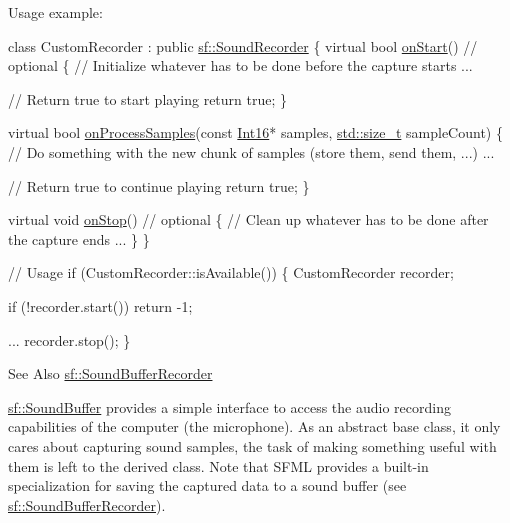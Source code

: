 Usage example\-: 
\begin{DoxyCode}
\textcolor{keyword}{class }CustomRecorder : \textcolor{keyword}{public} \hyperlink{classsf_1_1_sound_recorder}{sf::SoundRecorder}
\{
    \textcolor{keyword}{virtual} \textcolor{keywordtype}{bool} \hyperlink{classsf_1_1_sound_recorder_a7af418fb036201d3f85745bef78ce77f}{onStart}() \textcolor{comment}{// optional}
    \{
        \textcolor{comment}{// Initialize whatever has to be done before the capture starts}
        ...

        \textcolor{comment}{// Return true to start playing}
        \textcolor{keywordflow}{return} \textcolor{keyword}{true};
    \}

    \textcolor{keyword}{virtual} \textcolor{keywordtype}{bool} \hyperlink{classsf_1_1_sound_recorder_a2670124cbe7a87c7e46b4840807f4fd7}{onProcessSamples}(\textcolor{keyword}{const} \hyperlink{namespacesf_a3c8e10435e2a310a7741755e66b5c94e}{Int16}* samples, 
      \hyperlink{curses_8priv_8h_ae43e1afb4123c6ddee091cf03ec10266}{std::size\_t} sampleCount)
    \{
        \textcolor{comment}{// Do something with the new chunk of samples (store them, send them, ...)}
        ...

        \textcolor{comment}{// Return true to continue playing}
        \textcolor{keywordflow}{return} \textcolor{keyword}{true};
    \}

    \textcolor{keyword}{virtual} \textcolor{keywordtype}{void} \hyperlink{classsf_1_1_sound_recorder_aefc36138ca1e96c658301280e4a31b64}{onStop}() \textcolor{comment}{// optional}
    \{
        \textcolor{comment}{// Clean up whatever has to be done after the capture ends}
        ...
    \}
\}

\textcolor{comment}{// Usage}
\textcolor{keywordflow}{if} (CustomRecorder::isAvailable())
\{
    CustomRecorder recorder;

    \textcolor{keywordflow}{if} (!recorder.start())
        \textcolor{keywordflow}{return} -1;

    ...
    recorder.stop();
\}
\end{DoxyCode}


\begin{DoxySeeAlso}{See Also}
\hyperlink{classsf_1_1_sound_buffer_recorder}{sf\-::\-Sound\-Buffer\-Recorder}
\end{DoxySeeAlso}
\hyperlink{classsf_1_1_sound_buffer}{sf\-::\-Sound\-Buffer} provides a simple interface to access the audio recording capabilities of the computer (the microphone). As an abstract base class, it only cares about capturing sound samples, the task of making something useful with them is left to the derived class. Note that S\-F\-M\-L provides a built-\/in specialization for saving the captured data to a sound buffer (see \hyperlink{classsf_1_1_sound_buffer_recorder}{sf\-::\-Sound\-Buffer\-Recorder}).

